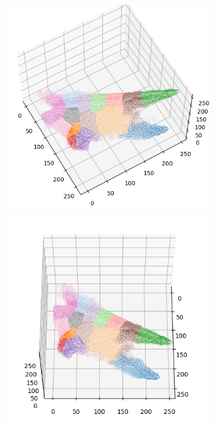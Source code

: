 \begin{figure}[htbp]
\begin{subfigure}[t]{0.32\textwidth}
    \end{subfigure}
    \begin{subfigure}[t]{0.32\textwidth}
        \includegraphics[width=\linewidth]{../../python_code/plots/kmeans/cat-110/clusters_elev60_azim-30.png}
    \end{subfigure}
    \begin{subfigure}[t]{0.32\textwidth}
        \includegraphics[width=\linewidth]{../../python_code/plots/kmeans/cat-110/clusters_elev60_azim0.png}
    \end{subfigure}
\end{figure}

